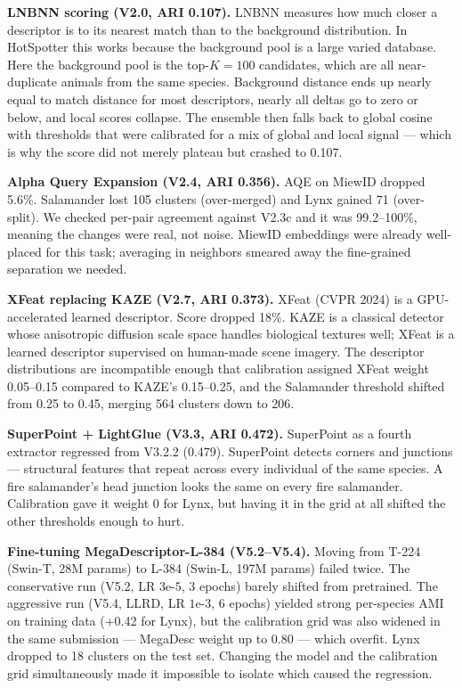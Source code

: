 \documentclass[]{ceurart}
\begin{document}
\textbf{LNBNN scoring (V2.0, ARI 0.107).}
LNBNN measures how much closer a descriptor is to its nearest match than to the
background distribution. In HotSpotter this works because the background pool is a
large varied database. Here the background pool is the top-$K=100$ candidates,
which are all near-duplicate animals from the same species. Background distance
ends up nearly equal to match distance for most descriptors, nearly all deltas
go to zero or below, and local scores collapse. The ensemble then falls back to
global cosine with thresholds that were calibrated for a mix of global and local
signal --- which is why the score did not merely plateau but crashed to 0.107.

\textbf{Alpha Query Expansion (V2.4, ARI 0.356).}
AQE on MiewID dropped 5.6\%. Salamander lost 105 clusters (over-merged) and Lynx
gained 71 (over-split). We checked per-pair agreement against V2.3c and it was
99.2--100\%, meaning the changes were real, not noise. MiewID embeddings were
already well-placed for this task; averaging in neighbors smeared away the
fine-grained separation we needed.

\textbf{XFeat replacing KAZE (V2.7, ARI 0.373).}
XFeat (CVPR 2024) is a GPU-accelerated learned descriptor. Score dropped 18\%.
KAZE is a classical detector whose anisotropic diffusion scale space handles
biological textures well; XFeat is a learned descriptor supervised on
human-made scene imagery.
The descriptor distributions are incompatible enough that calibration assigned
XFeat weight 0.05--0.15 compared to KAZE's 0.15--0.25, and the Salamander
threshold shifted from 0.25 to 0.45, merging 564 clusters down to 206.

\textbf{SuperPoint + LightGlue (V3.3, ARI 0.472).}
SuperPoint as a fourth extractor regressed from V3.2.2 (0.479). SuperPoint
detects corners and junctions --- structural features that repeat across every
individual of the same species. A fire salamander's head junction looks the same
on every fire salamander. Calibration gave it weight 0 for Lynx, but having it
in the grid at all shifted the other thresholds enough to hurt.

\textbf{Fine-tuning MegaDescriptor-L-384 (V5.2--V5.4).}
Moving from T-224 (Swin-T, 28M params) to L-384 (Swin-L, 197M params) failed
twice. The conservative run (V5.2, LR $3\text{e-}5$, 3 epochs) barely shifted
from pretrained. The aggressive run (V5.4, LLRD, LR $1\text{e-}3$, 6 epochs)
yielded strong per-species AMI on training data (+0.42 for Lynx), but the
calibration grid was also widened in the same submission --- MegaDesc weight up
to 0.80 --- which overfit. Lynx dropped to 18 clusters on the test set. Changing
the model and the calibration grid simultaneously made it impossible to isolate
which caused the regression.
\end{document}
